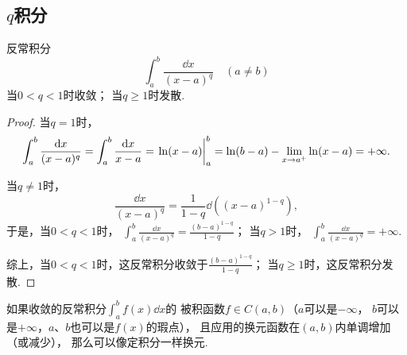 \subsection{\texorpdfstring{\(q\)}{q}积分}
\begin{proposition}[\(q\)积分]\label{example:定积分.q积分}
反常积分\[
	\int_a^b \frac{\dd{x}}{(x-a)^q}
	\quad(a \neq b)
\]
当\(0 < q < 1\)时收敛；
当\(q \geq 1\)时发散.
\begin{proof}
当\(q=1\)时，\[
	\int_a^b \frac{\dd{x}}{(x-a)^q}
	= \int_a^b \frac{\dd{x}}{x-a}
	= \eval{\ln(x-a)}_a^b
	= \ln(b-a) - \lim_{x \to a^+} \ln(x-a)
	= +\infty.
\]

当\(q\neq1\)时，\[
	\frac{\dd{x}}{(x-a)^q}
	= \frac{1}{1-q} \dd((x-a)^{1-q}),
\]
于是，当\(0<q<1\)时，
\(\int_a^b \frac{\dd{x}}{(x-a)^q}
= \frac{(b-a)^{1-q}}{1-q}\)；
当\(q>1\)时，
\(\int_a^b \frac{\dd{x}}{(x-a)^q}
= +\infty\).

综上，当\(0<q<1\)时，这反常积分收敛于\(\frac{(b-a)^{1-q}}{1-q}\)；
当\(q\geq1\)时，这反常积分发散.
\end{proof}
\end{proposition}

如果收敛的反常积分\(\int_a^b f(x) \dd{x}\)的
被积函数\(f \in C(a,b)\)（\(a\)可以是\(-\infty\)，
\(b\)可以是\(+\infty\)，\(a\)、\(b\)也可以是\(f(x)\)的瑕点），
且应用的换元函数在\((a,b)\)内单调增加（或减少），
那么可以像定积分一样换元.

